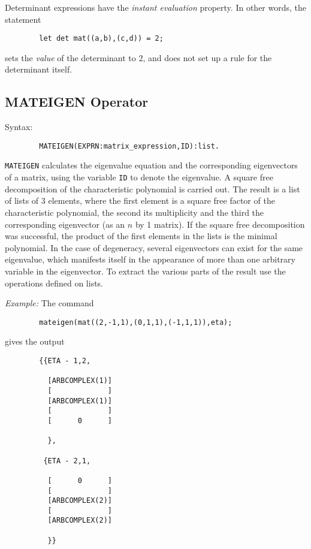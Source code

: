 Determinant expressions have the \emph{instant evaluation} property.
  In other words, the statement
\begin{verbatim}
        let det mat((a,b),(c,d)) = 2;
\end{verbatim}
sets the \emph{value} of the determinant to 2, and does not set up a rule
for the determinant itself.

\subsection{MATEIGEN Operator}
\hypertarget{operator:MATEIGEN}{}
Syntax:
\begin{verbatim}
        MATEIGEN(EXPRN:matrix_expression,ID):list.
\end{verbatim}

\texttt{MATEIGEN} calculates the eigenvalue equation and the corresponding
eigenvectors of a matrix, using the variable \texttt{ID} to denote the
eigenvalue.  A square free decomposition of the characteristic polynomial
is carried out.  The result is a list of lists of 3 elements, where the
first element is a square free factor of the characteristic polynomial,
the second its multiplicity and the third the corresponding eigenvector
(as an $n$ by 1 matrix).  If the square free decomposition was
successful, the product of the first elements in the lists is the minimal
polynomial.  In the case of degeneracy, several eigenvectors can exist for
the same eigenvalue, which manifests itself in the appearance of more than
one arbitrary variable in the eigenvector.  To extract the various parts
of the result use the operations defined on lists.

\textit{Example:}
 The command
\begin{verbatim}
        mateigen(mat((2,-1,1),(0,1,1),(-1,1,1)),eta);
\end{verbatim}
gives the output
\begin{verbatim}
        {{ETA - 1,2,

          [ARBCOMPLEX(1)]
          [             ]
          [ARBCOMPLEX(1)]
          [             ]
          [      0      ]

          },

         {ETA - 2,1,

          [      0      ]
          [             ]
          [ARBCOMPLEX(2)]
          [             ]
          [ARBCOMPLEX(2)]

          }}
\end{verbatim}

